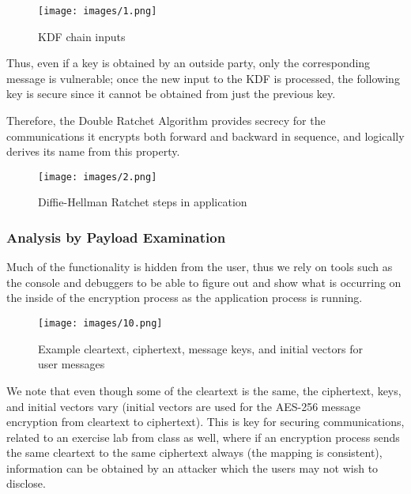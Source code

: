 \documentclass[12pt]{article}
\begin{document}
\begin{figure}[h!]
    \centering
    \texttt{[image: images/1.png]}
    \caption{KDF chain inputs\parencite{website:sigdocdoubleratchet}}
    \label{fig:my_label2}
\end{figure}

\newpage 
\par Thus, even if a key is obtained by an outside party, only the corresponding message is vulnerable; once the new input to the KDF is processed, the following key is secure since it cannot be obtained from just the previous key.
\par Therefore, the Double Ratchet Algorithm provides secrecy for the communications it encrypts both forward and backward in sequence, and logically derives its name from this property. 

\begin{figure}[h!]
    \centering
    \texttt{[image: images/2.png]}
    \caption{Diffie-Hellman Ratchet steps in application \parencite{website:sigdocdoubleratchet}}
    \label{fig:my_label2}
\end{figure}

\newpage 
\subsubsection{Analysis by Payload Examination}
Much of the functionality is hidden from the user, thus we rely on tools such as the console and debuggers to be able to figure out and show what is occurring on the inside of the encryption process as the application process is running.

\begin{figure}[h!]
    \centering
    \texttt{[image: images/10.png]}
    \caption{Example cleartext, ciphertext, message keys, and initial vectors for user messages}
    \label{fig:my_label2}
\end{figure}

\par We note that even though some of the cleartext is the same, the ciphertext, keys, and initial vectors vary (initial vectors are used for the AES-256 message encryption from cleartext to ciphertext). This is key for securing communications, related to an exercise lab from class as well, where if an encryption process sends the same cleartext to the same ciphertext always (the mapping is consistent), information can be obtained by an attacker which the users may not wish to disclose. 
\end{document}
